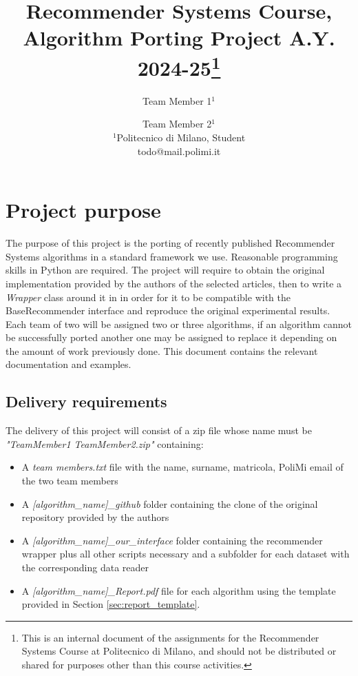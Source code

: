 \documentclass[a4paper]{article}
\title{Recommender Systems Course, Algorithm Porting Project A.Y. 2024-25\footnote{This is an internal document of the assignments for the Recommender Systems Course at Politecnico di Milano, and should not be distributed or shared for purposes other than this course activities.}}
\author{
Team Member 1$^1$\and
Team Member 2$^1$\\
\affiliations
$^1$Politecnico di Milano, Student\\
\emails
todo@mail.polimi.it
}
\begin{document}
\maketitle


\section{Project purpose}

The purpose of this project is the porting of recently published Recommender Systems algorithms in a standard framework we use.
Reasonable programming skills in Python are required. 
The project will require to obtain the original implementation provided by the authors of the selected articles, then to write a \emph{Wrapper} class around it in in order for it to be compatible with the BaseRecommender interface and reproduce the original experimental results. Each team of two will be assigned two or three algorithms, if an algorithm cannot be successfully ported another one may be assigned to replace it depending on the amount of work previously done.
This document contains the relevant documentation and examples.



\subsection{Delivery requirements}
The delivery of this project will consist of a zip file whose name must be \emph{"TeamMember1 TeamMember2.zip"} containing:
\begin{itemize}
    \item A \emph{team members.txt} file with the name, surname, matricola, PoliMi email of the two team members
    \item A \emph{[algorithm\_name]\_github} folder containing the clone of the original repository provided by the authors
    \item A \emph{[algorithm\_name]\_our\_interface} folder containing the recommender wrapper plus all other scripts necessary and a subfolder for each dataset with the corresponding data reader
    \item A \emph{[algorithm\_name]\_Report.pdf} file for each algorithm using the template provided in Section \ref{sec:report_template}.
\end{itemize}
\end{document}
